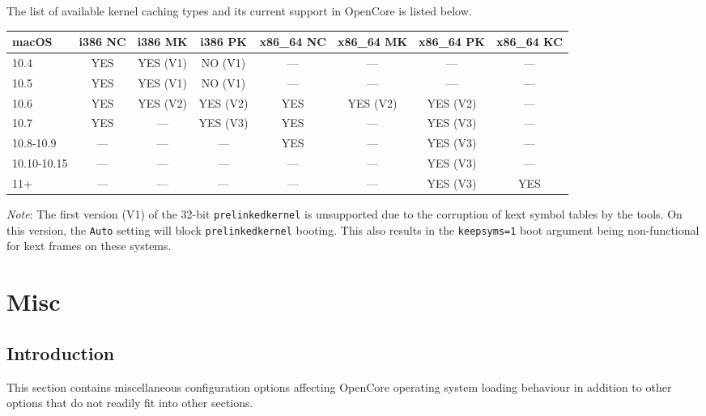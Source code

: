 \documentclass[]{article}
\makeatletter
\renewcommand{\label}[1]{%
\zref@wrapper@immediate{\oldlabel{#1}}}  %
\makeatother
\begin{document}
\begin{enumerate}
  The list of available kernel caching types and its current support in OpenCore is listed below.

  \begin{center}
  \begin{tabular}{|p{0.67in}|c|c|c|c|c|c|c|}
  \hline
  \textbf{macOS} & \textbf{i386 NC} & \textbf{i386 MK} & \textbf{i386 PK} & \textbf{x86\_64 NC} & \textbf{x86\_64 MK} & \textbf{x86\_64 PK} & \textbf{x86\_64 KC} \\
  \hline
  10.4 & YES & YES (V1) & NO (V1) & --- & --- & --- & --- \\
  \hline
  10.5 & YES & YES (V1) & NO (V1) & --- & --- & --- & --- \\
  \hline
  10.6 & YES & YES (V2) & YES (V2) & YES & YES (V2) & YES (V2) & --- \\
  \hline
  10.7 & YES & --- & YES (V3) & YES & --- & YES (V3) & --- \\
  \hline
  10.8-10.9 & --- & --- & --- & YES & --- & YES (V3) & --- \\
  \hline
  10.10-10.15 & --- & --- & --- & --- & --- & YES (V3) & --- \\
  \hline
  11+ & --- & --- & --- & --- & --- & YES (V3) & YES \\
  \hline
  \end{tabular}
  \end{center}

  \emph{Note}: The first version (V1) of the 32-bit \texttt{prelinkedkernel} is unsupported due to
  the corruption of kext symbol tables by the tools. On this version, the \texttt{Auto} setting will
  block \texttt{prelinkedkernel} booting. This also results in the \texttt{keepsyms=1} boot argument
  being non-functional for kext frames on these systems.

\end{enumerate}


\section{Misc}\label{misc}

\subsection{Introduction}\label{miscintro}

This section contains miscellaneous configuration options affecting OpenCore operating system
loading behaviour in addition to other options that do not readily fit into other sections.
\end{document}

